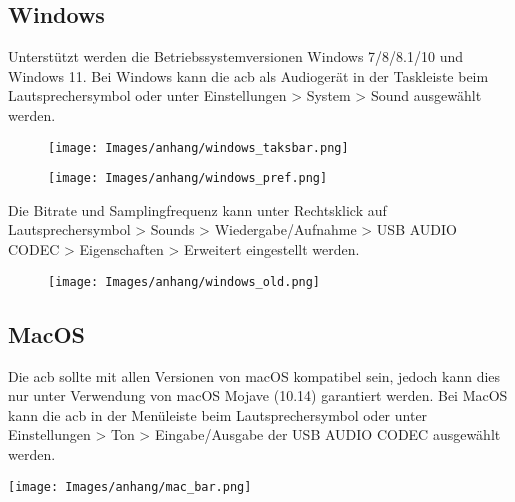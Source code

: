 \subsection{Windows}

\begin{minipage}[t]{0.55\textwidth}
Unterstützt werden die Betriebssystemversionen Windows 7/8/8.1/10 und Windows 11.
Bei Windows kann die \ac{acb} als Audiogerät in der Taskleiste beim Lautsprechersymbol oder unter \dq Einstellungen > System > Sound\dq\; ausgewählt werden.
\end{minipage}
\begin{minipage}[t]{0.45\textwidth}
    
\begin{figure}[H]
    \centering
    \texttt{[image: Images/anhang/windows\_taksbar.png]}
    \caption*{}
\end{figure}

\end{minipage}
\begin{figure}[H]
    \centering
    \texttt{[image: Images/anhang/windows\_pref.png]}
    \caption*{}
\end{figure}
Die Bitrate und Samplingfrequenz kann unter  \dq Rechtsklick auf Lautsprechersymbol > Sounds > Wiedergabe/Aufnahme > USB AUDIO CODEC > Eigenschaften > Erweitert\dq\; eingestellt werden.
\begin{figure}[H]
    \centering
    \texttt{[image: Images/anhang/windows\_old.png]}
    \caption*{}
\end{figure}

\subsection{MacOS}
\begin{minipage}[t]{0.55\textwidth}
    Die \ac{acb} sollte mit allen Versionen von macOS kompatibel sein, jedoch kann dies nur unter Verwendung von macOS Mojave (10.14) garantiert werden. Bei MacOS kann die \ac{acb} in der Menüleiste beim Lautsprechersymbol oder unter \dq Einstellungen > Ton > Eingabe/Ausgabe\dq\; der USB AUDIO CODEC ausgewählt werden. 
\end{minipage}
\pagebreak
\begin{minipage}[t]{0.45\textwidth}
    \vspace{0pt}
    \centering
    \texttt{[image: Images/anhang/mac\_bar.png]}
\end{minipage}

